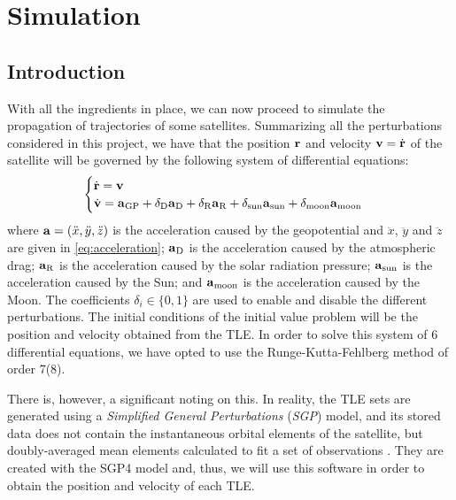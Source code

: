 \documentclass[../main.tex]{subfiles}
\begin{document}
\section{Simulation}\label{sec:simulation}
\subsection{Introduction}
With all the ingredients in place, we can now proceed to simulate the propagation of trajectories of some satellites.
Summarizing all the perturbations considered in this project, we have that the position $\boldsymbol{\mathrm{r}}$ and velocity $\boldsymbol{\mathrm{v}}=\dot{\boldsymbol{\mathrm{r}}}$ of the satellite will be governed by the following system of differential equations:
\begin{equation}
  \begin{cases}
    \dot{\boldsymbol{\mathrm{r}}}=\boldsymbol{\mathrm{v}} \\
    \dot{\boldsymbol{\mathrm{v}}}=\boldsymbol{\mathrm{a}}_{\mathrm{GP}} + \delta_{\mathrm{D}}\boldsymbol{\mathrm{a}}_{\mathrm{D}}+\delta_{\mathrm{R}}\boldsymbol{\mathrm{a}}_{\mathrm{R}}+\delta_{\mathrm{sun}}\boldsymbol{\mathrm{a}}_{\mathrm{sun}}+\delta_{\mathrm{moon}}\boldsymbol{\mathrm{a}}_\mathrm{moon}
  \end{cases}
\end{equation}
where $\boldsymbol{\mathrm{a}}=(\ddot{x},\ddot{y},\ddot{z})$ is the acceleration caused by the geopotential and $\ddot{x}$, $\ddot{y}$ and $\ddot{z}$ are given in \cref{eq:acceleration}; $\boldsymbol{\mathrm{a}}_{\mathrm{D}}$ is the acceleration caused by the atmospheric drag; $\boldsymbol{\mathrm{a}}_{\mathrm{R}}$ is the acceleration caused by the solar radiation pressure; $\boldsymbol{\mathrm{a}}_{\mathrm{sun}}$ is the acceleration caused by the Sun; and $\boldsymbol{\mathrm{a}}_{\mathrm{moon}}$ is the acceleration caused by the Moon. The coefficients $\delta_{i}\in\{0,1\}$ are used to enable and disable the different perturbations. The initial conditions of the initial value problem will be the position and velocity obtained from the TLE. In order to solve this system of 6 differential equations, we have opted to use the Runge-Kutta-Fehlberg method of order 7(8).

There is, however, a significant noting on this. In reality, the TLE sets are generated using a \emph{Simplified General Perturbations} (\emph{SGP}) model, and its stored data does not contain the instantaneous orbital elements of the satellite, but doubly-averaged mean elements calculated to fit a set of observations \cite{celestrak,celestrakReport}.
They are created with the SGP4 model and, thus, we will use this software in order to obtain the position and velocity of each TLE.
\end{document}
